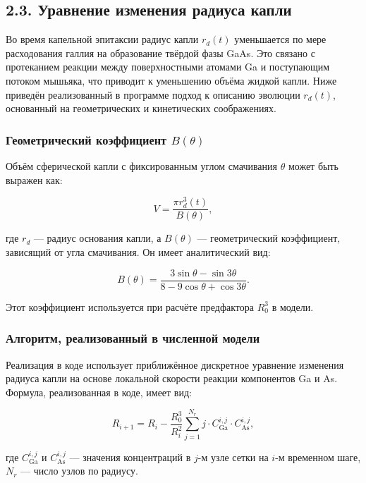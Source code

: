 \documentclass[14pt,oneside]{extarticle}
\begin{document}
\subsection{2.3. Уравнение изменения радиуса капли}

Во время капельной эпитаксии радиус капли $r_d(t)$ уменьшается по мере расходования галлия на образование твёрдой фазы GaAs. Это связано с протеканием реакции между поверхностными атомами Ga и поступающим потоком мышьяка, что приводит к уменьшению объёма жидкой капли. Ниже приведён реализованный в программе подход к описанию эволюции $r_d(t)$, основанный на геометрических и кинетических соображениях.

\subsubsection*{Геометрический коэффициент $B(\theta)$}

Объём сферической капли с фиксированным углом смачивания $\theta$ может быть выражен как:

\begin{equation}
V = \frac{\pi r_d^3(t)}{B(\theta)},
\end{equation}

где $r_d$ — радиус основания капли, а $B(\theta)$ — геометрический коэффициент, зависящий от угла смачивания. Он имеет аналитический вид:

\begin{equation}
B(\theta) = \frac{3 \sin \theta - \sin 3\theta}{8 - 9 \cos \theta + \cos 3\theta}.
\end{equation}

Этот коэффициент используется при расчёте предфактора $R_0^3$ в модели.

\subsubsection*{Алгоритм, реализованный в численной модели}

Реализация в коде использует приближённое дискретное уравнение изменения радиуса капли на основе локальной скорости реакции компонентов Ga и As. Формула, реализованная в коде, имеет вид:

\begin{equation}
R_{i+1} = R_i - \frac{R_0^3}{R_i^2} \sum_{j=1}^{N_r} j \cdot C_{\text{Ga}}^{i,j} \cdot C_{\text{As}}^{i,j},
\end{equation}

где $C_{\text{Ga}}^{i,j}$ и $C_{\text{As}}^{i,j}$ — значения концентраций в $j$-м узле сетки на $i$-м временном шаге, $N_r$ — число узлов по радиусу.
\end{document}
